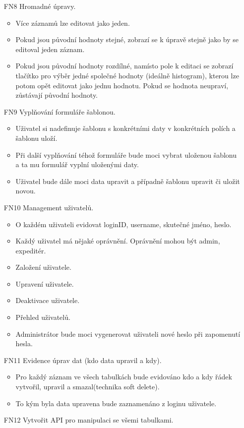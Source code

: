 \documentclass[thesis=B,czech]{FITthesis}[2012/06/26]
\begin{document}
\begin{enumerate}
	\item[FN8] Hromadné úpravy.
	\begin{itemize}
		\item Více záznamů lze editovat jako jeden. 
		\item Pokud jsou původní hodnoty stejné, zobrazí se k úpravě stejně jako by se editoval jeden záznam. 
		\item Pokud jsou původní hodnoty rozdílné, namísto pole k editaci se zobrazí tlačítko pro výběr jedné společné hodnoty (ideálně histogram), kterou lze potom opět editovat jako jednu hodnotu. Pokud se hodnota neupraví, zůstávají původní hodnoty.
	\end{itemize}
	\item[FN9] Vyplňování formuláře šablonou.
	\begin{itemize}
		\item Uživatel si nadefinuje šablonu s konkrétními daty v konkrétních polích a šablonu uloží. 
		\item Při další vyplňování téhož formuláře bude moci vybrat uloženou šablonu a ta mu formulář vyplní uloženými daty. 
		\item Uživatel bude dále moci data upravit a případně šablonu upravit či uložit novou.
	\end{itemize}
	\item[FN10] Management uživatelů.
	\begin{itemize}
		\item O každém uživateli evidovat loginID, username, skutečné jméno, heslo.
		\item Každý uživatel má nějaké oprávnění. Oprávnění mohou být admin, expeditér.
		\item Založení uživatele.
		\item Upravení uživatele.
		\item Deaktivace uživatele.
		\item Přehled uživatelů.
		\item Administrátor bude moci vygenerovat uživateli nové heslo při zapomenutí hesla.
	\end{itemize}
	\item[FN11] Evidence úprav dat (kdo data upravil a kdy).
	\begin{itemize}
		\item Pro každý záznam ve všech tabulkách bude evidováno kdo a kdy řádek vytvořil, upravil a smazal(technika soft delete).
		\item To kým byla data upravena bude zaznamenáno z loginu uživatele.	
	\end{itemize}
	\item[FN12] Vytvořit API pro manipulaci se všemi tabulkami.
\end{enumerate}
\end{document}
